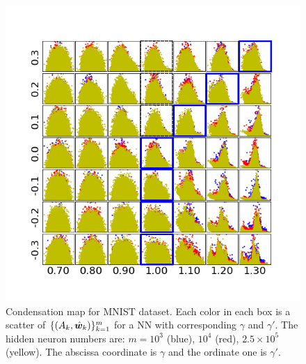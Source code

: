 \documentclass{article}
\begin{document}
\begin{figure}
    \centering
    \includegraphics[scale=0.8]{pic/scalestudym2/angleamptogether.png}
    \caption{Condensation map for MNIST dataset. Each color in each box is a scatter of $\{(A_k,\hat{\bm{w}}_k)\}_{k=1}^m$ for a NN with corresponding $\gamma$ and $\gamma'$. The hidden neuron numbers are:  $m=10^{3}$ (blue), $10^{4}$ (red), $2.5\times 10^{5}$ (yellow). The abscissa coordinate is $\gamma$ and the ordinate one is $\gamma'$.}
    \label{fig:mnistcdnmap}
\end{figure}

\end{document}
